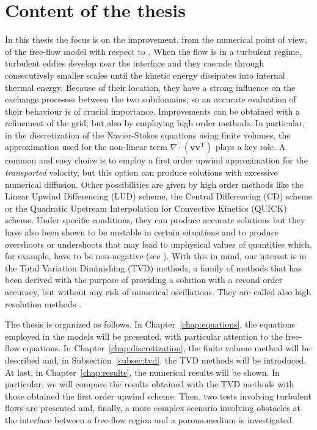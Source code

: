 \section{Content of the thesis}
In this thesis the focus is on the improvement, from the numerical point of view, of the free-flow model with respect to \cite{tesi:fetzer}. When the flow is in a turbulent regime, turbulent eddies develop near the interface and 
they cascade through consecutively smaller scales until the kinetic energy 
dissipates into internal thermal energy. Because of their location, they have 
a strong influence on the exchange processes between the two subdomains, so an 
accurate evaluation of their behaviour is of crucial importance. Improvements 
can be obtained with a refinement of the grid, but also by employing 
high order methods. In 
particular, in the discretization of the Navier-Stokes equations using finite 
volumes, the approximation used for the non-linear term 
$\nabla \cdot (\mathbf{v} \mathbf{v}^\mathrm{T})$ plays a key role. A common and easy 
choice is to employ a first order upwind approximation for the 
\emph{transported} velocity, but this option can produce solutions with 
excessive numerical diffusion. Other possibilities are given by high order 
methods 
like the Linear Upwind Differencing (LUD) scheme, the Central Differencing (CD) 
scheme or the Quadratic Upstream Interpolation for Convective Kinetics (QUICK) 
scheme. Under specific conditions, they can produce 
accurate solutions but they have also been shown to be unstable in certain 
situations and to produce overshoots or undershoots that 
may lead to unphysical values of quantities which, for example, have to be 
non-negative (see \cite{main:vermal}). With this in mind, our interest is in 
the Total Variation Diminishing (TVD) methods, a family of methods that has 
been derived with the purpose of providing a solution with a second order 
accuracy, but without any risk of numerical oscillations. They are called also 
high resolution methods \cite{tvd:monotonicity}.

The thesis is organized as follows. In Chapter~\ref{chap:equations}, the equations employed in the models will be 
presented, with particular attention to the free-flow equations. In 
Chapter~\ref{chap:discretization}, the finite volume method will be described 
and, in Subsection~\ref{subsec:tvd}, the TVD methods will be introduced. At last, 
in Chapter~\ref{chap:results}, the numerical results will be shown. In 
particular, we will
compare the results obtained with the TVD methods with those obtained
the first order upwind scheme. Then, two tests 
involving turbulent flows are presented and, finally, a more complex scenario involving 
obstacles at the interface between a free-flow region and a porous-medium is investigated.

